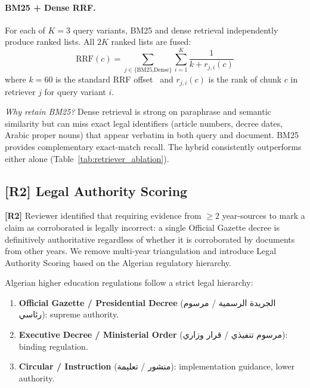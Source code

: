 \documentclass[12pt,a4paper]{article}
\newcommand{\response}[2]{%
  \vspace{4pt}
  \noindent\colorbox{yellow!20}{\parbox{\dimexpr\linewidth-2\fboxsep}{%
    \small\textbf{\color{revcolor}[R#1]} #2}}\vspace{4pt}}
\begin{document}
\paragraph{BM25 + Dense RRF.} For each of $K{=}3$ query variants, BM25 and dense
retrieval independently produce ranked lists. All $2K$ ranked lists are fused:
\begin{equation}
\text{RRF}(c) = \sum_{j \in \{\text{BM25,Dense}\}} \sum_{i=1}^{K} \frac{1}{k + r_{j,i}(c)}
\label{eq:rrf}
\end{equation}
where $k=60$ is the standard RRF offset~\cite{cormack2009rrf} and $r_{j,i}(c)$
is the rank of chunk $c$ in retriever $j$ for query variant $i$.

\textit{Why retain BM25?} Dense retrieval is strong on paraphrase and semantic
similarity but can miss exact legal identifiers (article numbers, decree dates,
Arabic proper nouns) that appear verbatim in both query and document. BM25
provides complementary exact-match recall. The hybrid consistently outperforms
either alone (Table~\ref{tab:retriever_ablation}).

\subsection{[R2] Legal Authority Scoring}
\label{sec:authority}

\response{2}{Reviewer identified that requiring evidence from $\geq 2$ year-sources
to mark a claim as corroborated is legally incorrect: a single Official Gazette
decree is definitively authoritative regardless of whether it is corroborated by
documents from other years. We remove multi-year triangulation and introduce
Legal Authority Scoring based on the Algerian regulatory hierarchy.}

Algerian higher education regulations follow a strict legal hierarchy:
\begin{enumerate}[leftmargin=*,nosep]
\item \textbf{Official Gazette / Presidential Decree} (الجريدة الرسمية / مرسوم رئاسي): supreme authority.
\item \textbf{Executive Decree / Ministerial Order} (مرسوم تنفيذي / قرار وزاري): binding regulation.
\item \textbf{Circular / Instruction} (منشور / تعليمة): implementation guidance, lower authority.
\end{enumerate}
\end{document}
